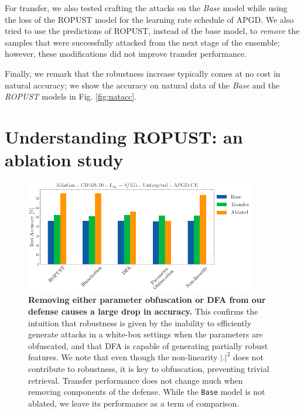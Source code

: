 For transfer, we also tested crafting the attacks on the \textit{Base} model while using the loss of the ROPUST model for the learning rate schedule of APGD. We also tried to use the predictions of ROPUST, instead of the base model, to \textit{remove} the samples that were successfully attacked from the next stage of the ensemble; however, these modifications did not improve transfer performance.

Finally, we remark that the robustness increase typically comes at no cost in natural accuracy; we show the accuracy on natural data of the \textit{Base} and the \textit{ROPUST} models in Fig. \ref{fig:natacc}.

\section{Understanding ROPUST: an ablation study}\label{sec:ablation}
\begin{figure}
    \centering
    \includegraphics[width=0.9\textwidth]{sections/appendix/ropust_icassp2022/ablation.png}
    \caption{\textbf{Removing either parameter obfuscation or DFA from our defense causes a large drop in accuracy.} This confirms the intuition that robustness is given by the inability to efficiently generate attacks in a white-box settings when the parameters are obfuscated, and that DFA is capable of generating partially robust features. We note that even though the non-linearity $|.|^2$ does not contribute to robustness, it is key to obfuscation, preventing trivial retrieval. Transfer performance does not change much when removing components of the defense. While the \texttt{Base} model is not ablated, we leave its performance as a term of comparison.}
    \label{fig:ablation}
\end{figure}
